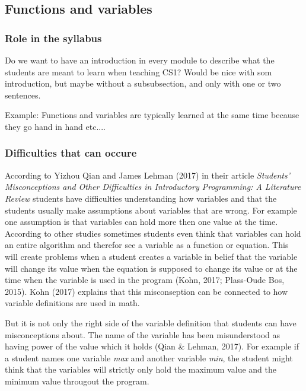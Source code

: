 \documentclass[twocolumn]{article}
\begin{document}
\subsection{Functions and variables}

\subsubsection{Role in the syllabus}

Do we want to have an introduction in every module to describe what the students are meant to learn when teaching CS1? Would be nice with som introduction, but maybe without a subsubsection, and only with one or two sentences. 

Example: Functions and variables are typically learned at the same time because they go hand in hand etc....

\subsubsection{Difficulties that can occure}

According to Yizhou Qian and James Lehman (2017) in their article \emph{Students’ Misconceptions and Other Difficulties in Introductory Programming: A Literature Review} students have difficulties understanding how variables and that the students usually make assumptions about variables that are wrong. For example one assumption is that variables can hold more then one value at the time. According to other studies sometimes students even think that variables can hold an entire algorithm and therefor see a variable as a function or equation. This will create problems when a student creates a variable in belief that the variable will change its value when the equation is supposed to change its value or at the time when the variable is used in the program (Kohn, 2017; Plass-Oude Bos, 2015). Kohn (2017) explains that this misconseption can be connected to how variable definitions are used in math. 

But it is not only the right side of the variable definition that students can have misconceptions about. The name of the variable has been misunderstood as having power of the value which it holds (Qian \& Lehman, 2017). For example if a student names one variable \emph{max} and another variable \emph{min}, the student might think that the variables will strictly only hold the maximum value and the minimum value througout the program. 
\end{document}
